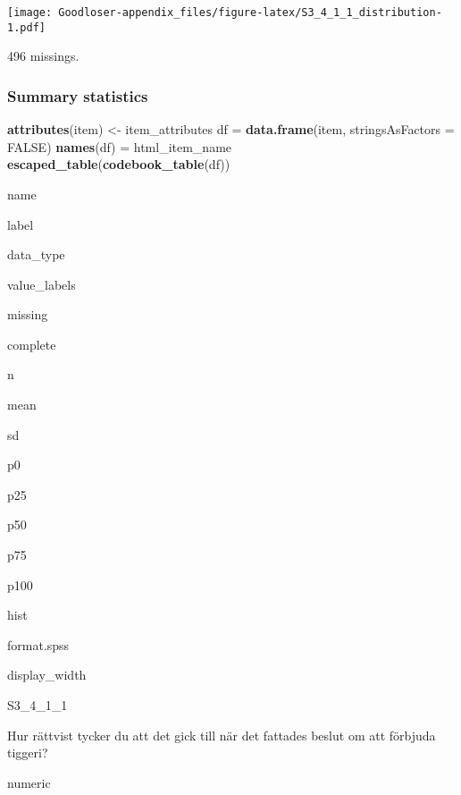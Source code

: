 \documentclass[]{book}
\newenvironment{Shaded}{\begin{snugshade}}{\end{snugshade}}
\newcommand{\KeywordTok}[1]{\textcolor[rgb]{0.13,0.29,0.53}{\textbf{#1}}}
\newcommand{\DataTypeTok}[1]{\textcolor[rgb]{0.13,0.29,0.53}{#1}}
\newcommand{\StringTok}[1]{\textcolor[rgb]{0.31,0.60,0.02}{#1}}
\newcommand{\OtherTok}[1]{\textcolor[rgb]{0.56,0.35,0.01}{#1}}
\newcommand{\OperatorTok}[1]{\textcolor[rgb]{0.81,0.36,0.00}{\textbf{#1}}}
\newcommand{\NormalTok}[1]{#1}
\begin{document}
\texttt{[image: Goodloser-appendix\_files/figure-latex/S3\_4\_1\_1\_distribution-1.pdf]}

\begin{Shaded}
\end{Shaded}

496 missings.

\subsubsection{Summary statistics}\label{S3_4_1_1_summary}

\begin{Shaded}
\begin{Highlighting}[]
\KeywordTok{attributes}\NormalTok{(item) <-}\StringTok{ }\NormalTok{item_attributes}
\NormalTok{df =}\StringTok{ }\KeywordTok{data.frame}\NormalTok{(item, }\DataTypeTok{stringsAsFactors =} \OtherTok{FALSE}\NormalTok{)}
\KeywordTok{names}\NormalTok{(df) =}\StringTok{ }\NormalTok{html_item_name}
\KeywordTok{escaped_table}\NormalTok{(}\KeywordTok{codebook_table}\NormalTok{(df))}
\end{Highlighting}
\end{Shaded}

name

label

data\_type

value\_labels

missing

complete

n

mean

sd

p0

p25

p50

p75

p100

hist

format.spss

display\_width

S3\_4\_1\_1

Hur rättvist tycker du att det gick till när det fattades beslut om att
förbjuda tiggeri?

numeric
\end{document}
